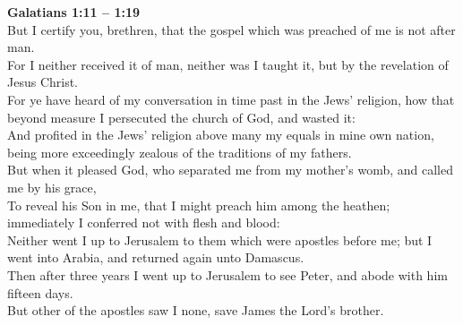 \documentclass[10pt]{article} %
\begin{document}
{\begin{minipage}[t]{0.45\textwidth}
\textbf{Galatians 1:11 -- 1:19}\\
But I certify you, brethren, that the gospel which was preached of me is not after man.\\
For I neither received it of man, neither was I taught it, but by the revelation of Jesus Christ.\\
For ye have heard of my conversation in time past in the Jews' religion, how that beyond measure I persecuted the church of God, and wasted it:\\
And profited in the Jews' religion above many my equals in mine own nation, being more exceedingly zealous of the traditions of my fathers.\\
But when it pleased God, who separated me from my mother's womb, and called me by his grace,\\
To reveal his Son in me, that I might preach him among the heathen; immediately I conferred not with flesh and blood:\\
Neither went I up to Jerusalem to them which were apostles before me; but I went into Arabia, and returned again unto Damascus.\\
Then after three years I went up to Jerusalem to see Peter, and abode with him fifteen days.\\
But other of the apostles saw I none, save James the Lord's brother.\\
\end{minipage}}
\vspace*{\fill}
\newpage\Huge
\vspace*{\fill}
\doublespacing %
\vspace*{\fill}
\end{document}
